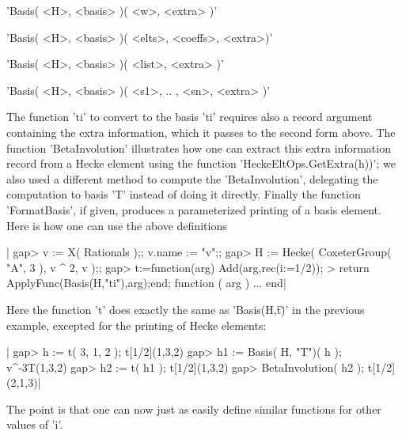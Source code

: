 'Basis( <H>, <basis> )( <w>, <extra> )'

'Basis( <H>, <basis> )( <elts>, <coeffs>, <extra>)'

'Basis( <H>, <basis> )( <list>, <extra> )'

'Basis( <H>, <basis> )( <s1>, .. , <sn>, <extra> )'

The  function 'ti'  to convert  to the  basis 'ti'  requires also  a record
argument  containing the extra  information, which it  passes to the second
form  above. The function 'BetaInvolution'  illustrates how one can extract
this  extra  information  record  from  a  Hecke element using the function
'HeckeEltOps.GetExtra(h))';  we also used a different method to compute the
'BetaInvolution',  delegating the computation to basis 'T' instead of doing
it  directly.  Finally  the  function  'FormatBasis',  if given, produces a
parameterized  printing of  a basis  element. Here  is how  one can use the
above definitions\:

|    gap> v := X( Rationals );; v.name := "v";;
    gap> H := Hecke( CoxeterGroup( "A", 3 ), v ^ 2, v );;
    gap> t:=function(arg) Add(arg,rec(i:=1/2));
    >  return ApplyFunc(Basis(H,"ti"),arg);end;
    function ( arg ) ... end|

Here  the function  't' does  exactly the  same as  'Basis(H,\"t\")' in the
previous example, excepted for the printing of Hecke elements:

|    gap> h := t( 3, 1, 2 );
    t[1/2](1,3,2)
    gap> h1 := Basis( H, "T")( h );
    v^-3T(1,3,2)
    gap> h2 := t( h1 );
    t[1/2](1,3,2)
    gap> BetaInvolution( h2 );
    t[1/2](2,1,3)|

The  point is that one can now  just as easily define similar functions for
other values of 'i'.

